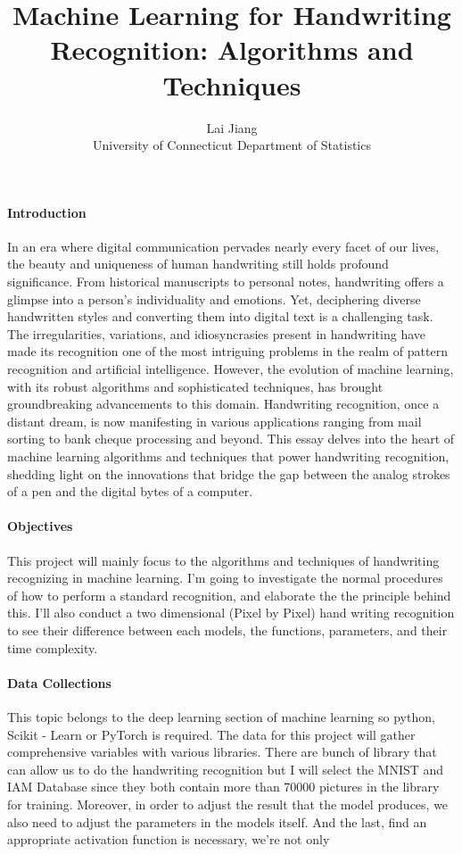 \documentclass[12pt]{article}
\title{Machine Learning for Handwriting Recognition: Algorithms and Techniques}
\author{Lai Jiang\\
  University of Connecticut Department of Statistics
}
\begin{document}
\maketitle

\paragraph{Introduction}
In an era where digital communication pervades nearly every facet of our lives, the beauty and uniqueness of human handwriting still holds profound significance. From historical manuscripts to personal notes, handwriting offers a glimpse into a person's individuality and emotions. Yet, deciphering diverse handwritten styles and converting them into digital text is a challenging task. The irregularities, variations, and idiosyncrasies present in handwriting have made its recognition one of the most intriguing problems in the realm of pattern recognition and artificial intelligence. However, the evolution of machine learning, with its robust algorithms and sophisticated techniques, has brought groundbreaking advancements to this domain. Handwriting recognition, once a distant dream, is now manifesting in various applications ranging from mail sorting to bank cheque processing and beyond. This essay delves into the heart of machine learning algorithms and techniques that power handwriting recognition, shedding light on the innovations that bridge the gap between the analog strokes of a pen and the digital bytes of a computer.

\paragraph{Objectives}
This project will mainly focus to the algorithms and techniques of handwriting recognizing in machine learning. I'm going to investigate the normal procedures of how to perform a standard recognition, and elaborate the the principle behind this. I'll also conduct a two dimensional (Pixel by Pixel) hand writing recognition to see their difference between each models, the functions, parameters, and their time complexity.

\paragraph{Data Collections}
This topic belongs to the deep learning section of machine learning so python, Scikit - Learn or PyTorch is required. The data for this project will gather comprehensive variables with various libraries. There are bunch of library that can allow us to do the handwriting recognition but I will select the MNIST and IAM Database since they both contain more than 70000 pictures in the library for training. Moreover, in order to adjust the result that the model produces, we also need to adjust the parameters in the models itself. And the last, find an appropriate activation function is necessary, we're not only 
\end{document}
